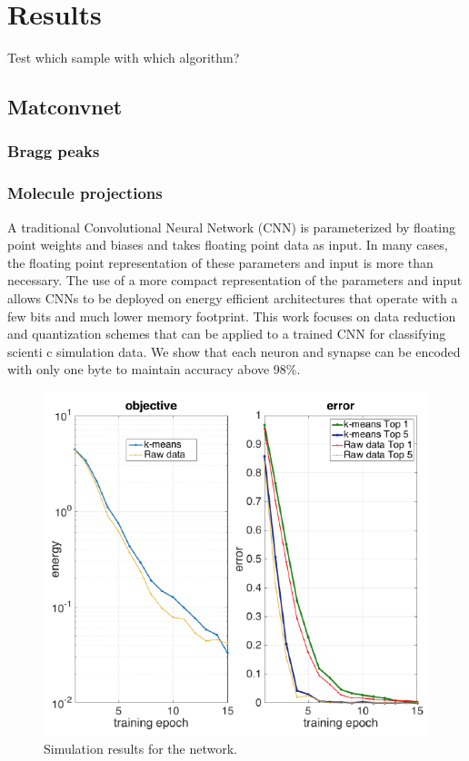 \section{Results}
Test which sample with which algorithm?

\subsection{Matconvnet}
\subsubsection{Bragg peaks}
\subsubsection{Molecule projections}
A traditional Convolutional Neural Network (CNN) is parameterized by floating point weights and biases
and takes floating point data as input. In many cases, the floating point representation of these
parameters and input is more than necessary. The use of a more compact representation of the
parameters and input allows CNNs to be deployed on energy efficient architectures that operate with a
few bits and much lower memory footprint. This work focuses on data reduction and quantization schemes
that can be applied to a trained CNN for classifying scienti c simulation data. We show that each
neuron and synapse can be encoded with only one byte to maintain accuracy above 98\%.
\begin{figure}[h]
\centering
\includegraphics[width=\linewidth]{img/joao3.png}
\caption{Simulation results for the network.}
\label{fig_sim}
\end{figure}


